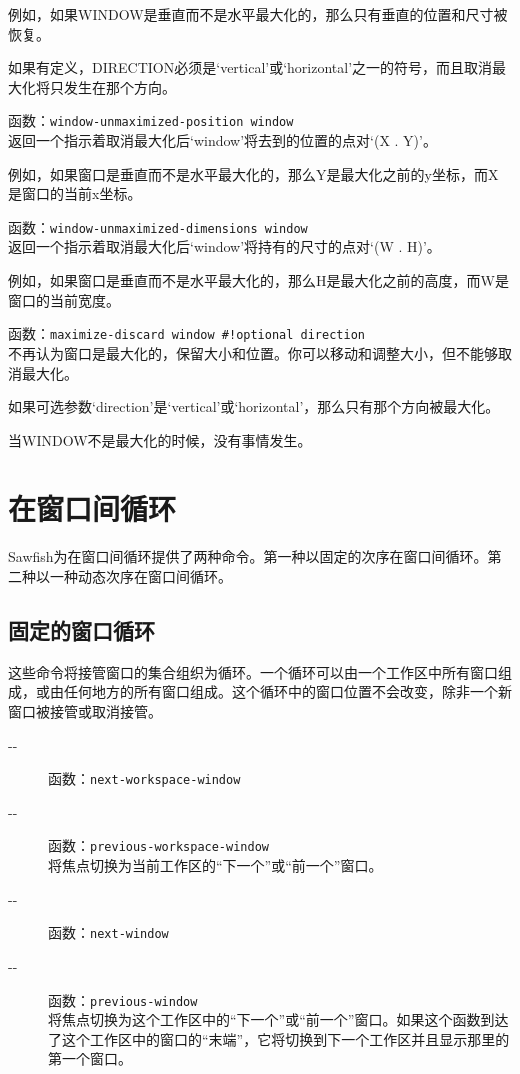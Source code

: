\documentclass{book}
\begin{document}
\begin{CJK*}{UTF8}{gbsn}
\begin{description}
例如，如果WINDOW是垂直而不是水平最大化的，那么只有垂直的位置和尺寸被恢复。

如果有定义，DIRECTION必须是`vertical'或`horizontal'之一的符号，而且取消最大化将只发生在那个方向。
\item[-{}-] 函数：\verb|window-unmaximized-position window|\\
返回一个指示着取消最大化后`window'将去到的位置的点对`(X . Y)'。

例如，如果窗口是垂直而不是水平最大化的，那么Y是最大化之前的y坐标，而X是窗口的当前x坐标。
\item[-{}-] 函数：\verb|window-unmaximized-dimensions window|\\
返回一个指示着取消最大化后`window'将持有的尺寸的点对`(W . H)'。

例如，如果窗口是垂直而不是水平最大化的，那么H是最大化之前的高度，而W是窗口的当前宽度。
\item[-{}-] 函数：\verb|maximize-discard window #!optional direction|\\
不再认为窗口是最大化的，保留大小和位置。你可以移动和调整大小，但不能够取消最大化。

如果可选参数`direction'是`vertical'或`horizontal'，那么只有那个方向被最大化。

当WINDOW不是最大化的时候，没有事情发生。
\end{description}
\section{在窗口间循环}
Sawfish为在窗口间循环提供了两种命令。第一种以固定的次序在窗口间循环。第二种以一种动态次序在窗口间循环。
\subsection{固定的窗口循环}
这些命令将接管窗口的集合组织为循环。一个循环可以由一个工作区中所有窗口组成，或由任何地方的所有窗口组成。这个循环中的窗口位置不会改变，除非一个新窗口被接管或取消接管。
\begin{description}
\item[-{}-] 函数：\verb|next-workspace-window|
\item[-{}-] 函数：\verb|previous-workspace-window|\\
将焦点切换为当前工作区的``下一个''或``前一个''窗口。
\item[-{}-] 函数：\verb|next-window|
\item[-{}-] 函数：\verb|previous-window|\\
将焦点切换为这个工作区中的``下一个''或``前一个''窗口。如果这个函数到达了这个工作区中的窗口的``末端''，它将切换到下一个工作区并且显示那里的第一个窗口。
\end{description}

\end{CJK*}
\end{document}
